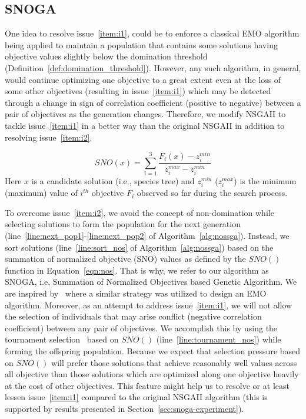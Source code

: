 \subsection{SNOGA}
One idea to resolve issue~\ref{item:i1}, could be to enforce a classical EMO algorithm being applied to maintain a population that contains some solutions having objective values slightly below the domination threshold (Definition~\ref{def:domination_threshold}). However, any such algorithm, in general, would continue optimizing one objective to a great extent even at the loss of some other objectives (resulting in issue~\ref{item:i1}) which may be detected through a change in sign of correlation coefficient (positive to negative)  between a pair of objectives as the generation changes. 
Therefore, we modify NSGAII to tackle issue~\ref{item:i1} in a better way than the original NSGAII in addition to resolving issue~\ref{item:i2}.  

\begin{equation}\label{eqn:nos}
SNO(x) = \sum_{i=1}^{3} \frac{F_i(x)-z_i^{min}}{z_i^{max}-z_i^{min}}
\end{equation}
Here $x$ is a candidate solution (i.e., species tree) and $z_i^{min}$ ($z_i^{max}$) is the minimum (maximum) value of $i^{th}$ objective $F_i$ observed so far during the search process.

To overcome issue~\ref{item:i2}, we avoid the concept of non-domination while selecting solutions to form the population for the next generation (line~\ref{line:next_pop1}-\ref{line:next_pop2} of Algorithm~\ref{alg:nossga}). Instead, we sort solutions (line~\ref{line:sort_nos} of Algorithm~\ref{alg:nossga}) based on the summation of normalized objective (SNO) values as defined by the $SNO()$ function in Equation~\ref{eqn:nos}. That is why, we refer to our algorithm as SNOGA, i.e, Summation of Normalized Objectives based Genetic Algorithm. We are inspired by~\cite{qu2010multi} where a similar strategy was utilized to design an EMO algorithm. Moreover, as an attempt to address issue~\ref{item:i1}, we will not allow the selection of individuals that may arise conflict (negative correlation coefficient) between any pair of objectives. We accomplish this by using the tournament selection~\cite{goldberg1991comparative} based on $SNO()$ (line~\ref{line:tournament_nos}) while forming the offspring population.
Because we expect that selection pressure based on $SNO()$ will prefer those solutions that achieve reasonably well values across all objective than those solutions which are optimized along one objective heavily at the cost of other objectives. This feature might help us to resolve or at least lessen issue~\ref{item:i1} compared to the original NSGAII algorithm (this is supported by results presented in Section~\ref{sec:snoga-experiment}). 

